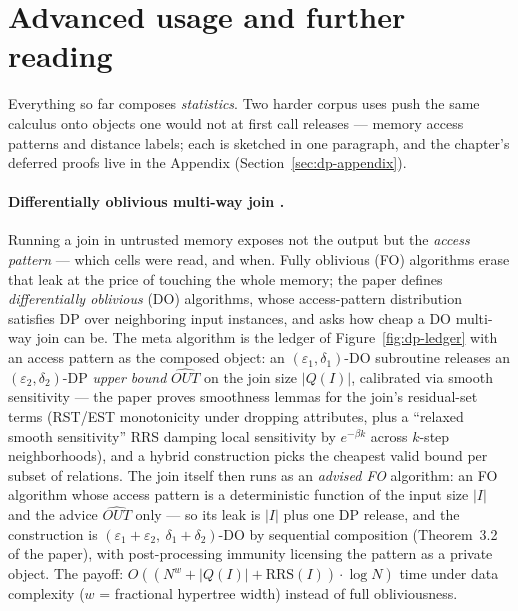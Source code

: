 \section{Advanced usage and further reading}
\label{sec:dp-advanced}

Everything so far composes \emph{statistics}. Two harder corpus uses push the same
calculus onto objects one would not at first call releases --- memory access patterns
and distance labels; each is sketched in one paragraph, and the chapter's deferred
proofs live in the Appendix (Section~\ref{sec:dp-appendix}).

\paragraph{Differentially oblivious multi-way join \citep{sigmod26-073}.}
Running a join in untrusted memory exposes not the output but the \emph{access pattern}
--- which cells were read, and when. Fully oblivious (FO) algorithms erase that leak at
the price of touching the whole memory; the paper defines \emph{differentially
oblivious} (DO) algorithms, whose access-pattern distribution satisfies DP over
neighboring input instances, and asks how cheap a DO multi-way join can be. The meta
algorithm is the ledger of Figure~\ref{fig:dp-ledger} with an access pattern as the
composed object: an $(\varepsilon_1,\delta_1)$-DO subroutine releases an
$(\varepsilon_2,\delta_2)$-DP \emph{upper bound} $\widehat{OUT}$ on the join size
$|Q(I)|$, calibrated via smooth sensitivity --- the paper proves smoothness lemmas for
the join's residual-set terms (RST/EST monotonicity under dropping attributes, plus a
``relaxed smooth sensitivity'' RRS damping local sensitivity by $e^{-\beta k}$ across
$k$-step neighborhoods), and a hybrid construction picks the cheapest valid bound per
subset of relations. The join itself then runs as an \emph{advised FO} algorithm: an FO
algorithm whose access pattern is a deterministic function of the input size $|I|$ and
the advice $\widehat{OUT}$ only --- so its leak is $|I|$ plus one DP release, and the
construction is $(\varepsilon_1+\varepsilon_2,\ \delta_1+\delta_2)$-DO by sequential
composition (Theorem~3.2 of the paper), with post-processing immunity licensing the
pattern as a private object. The payoff: $O((N^w + |Q(I)| + \mathrm{RRS}(I))\cdot
\log N)$ time under data complexity ($w$ = fractional hypertree width) instead of full
obliviousness.


